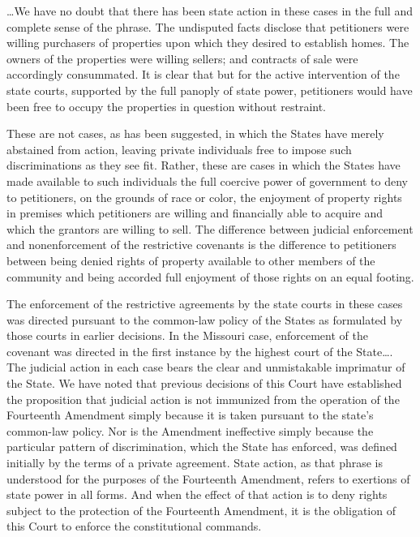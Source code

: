 
\ldots We have no doubt that there has been state action in these cases
in the full and complete sense of the phrase. The undisputed facts disclose that
petitioners were willing purchasers of properties upon which they desired to
establish homes. The owners of the properties were willing sellers; and
contracts of sale were accordingly consummated. It is clear that but for the
active intervention of the state courts, supported by the full panoply of state
power, petitioners would have been free to occupy the properties in question
without restraint.

These are not cases, as has been suggested, in which the States have merely
abstained from action, leaving private individuals free to impose such
discriminations as they see fit. Rather, these are cases in which the States
have made available to such individuals the full coercive power of government to
deny to petitioners, on the grounds of race or color, the enjoyment of property
rights in premises which petitioners are willing and financially able to acquire
and which the grantors are willing to sell. The difference between judicial
enforcement and nonenforcement of the restrictive covenants is the difference to
petitioners between being denied rights of property available to other members
of the community and being accorded full enjoyment of those rights on an equal
footing.

The enforcement of the restrictive agreements by the state courts in these cases
was directed pursuant to the common-law policy of the States as formulated by
those courts in earlier decisions. In the Missouri case, enforcement of the
covenant was directed in the first instance by the highest court of the
State\ldots . The judicial action in each case bears the clear and unmistakable
imprimatur of the State. We have noted that previous decisions of this Court
have established the proposition that judicial action is not immunized from the
operation of the Fourteenth Amendment simply because it is taken pursuant to the
state's common-law policy. Nor is the Amendment ineffective simply because the
particular pattern of discrimination, which the State has enforced, was defined
initially by the terms of a private agreement. State action, as that phrase is
understood for the purposes of the Fourteenth Amendment, refers to exertions of
state power in all forms. And when the effect of that action is to deny rights
subject to the protection of the Fourteenth Amendment, it is the obligation of
this Court to enforce the constitutional commands.

